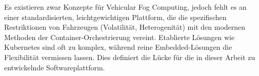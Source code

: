 Es existieren zwar Konzepte für Vehicular Fog Computing, jedoch fehlt es an einer standardisierten, leichtgewichtigen Plattform, die die spezifischen Restriktionen von Fahrzeugen (Volatilität, Heterogenität) mit den modernen Methoden der Container-Orchestrierung vereint. Etablierte Lösungen wie Kubernetes sind oft zu komplex, während reine Embedded-Lösungen die Flexibilität vermissen lassen. Dies definiert die Lücke für die in dieser Arbeit zu entwickelnde Softwareplattform.